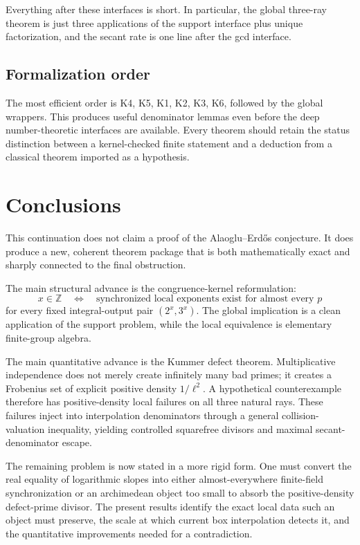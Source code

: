 \documentclass[11pt]{article}
\theoremstyle{definition}
\newcommand{\Z}{\mathbb Z}
\newcommand{\AEname}{Alaoglu--Erd\H{o}s}
\begin{document}
Everything after these interfaces is short.  In particular, the global three-ray theorem is
just three applications of the support interface plus unique factorization, and the secant
rate is one line after the gcd interface.

\subsection{Formalization order}

The most efficient order is K4, K5, K1, K2, K3, K6, followed by the global wrappers.  This
produces useful denominator lemmas even before the deep number-theoretic interfaces are
available.  Every theorem should retain the status distinction between a kernel-checked
finite statement and a deduction from a classical theorem imported as a hypothesis.

\section{Conclusions}
\label{sec:conclusion}

This continuation does not claim a proof of the \AEname{} conjecture.  It does produce a new,
coherent theorem package that is both mathematically exact and sharply connected to the final
obstruction.

The main structural advance is the congruence-kernel reformulation:
\[
 x\in\Z
 \quad\Longleftrightarrow\quad
 \text{synchronized local exponents exist for almost every }p
\]
for every fixed integral-output pair $(2^x,3^x)$.  The global implication is a clean
application of the support problem, while the local equivalence is elementary finite-group
algebra.

The main quantitative advance is the Kummer defect theorem.  Multiplicative independence does
not merely create infinitely many bad primes; it creates a Frobenius set of explicit positive
density $1/\ell^2$.  A hypothetical counterexample therefore has positive-density local
failures on all three natural rays.  These failures inject into interpolation denominators
through a general collision-valuation inequality, yielding controlled squarefree divisors and
maximal secant-denominator escape.

The remaining problem is now stated in a more rigid form.  One must convert the real equality
of logarithmic slopes into either almost-everywhere finite-field synchronization or an
archimedean object too small to absorb the positive-density defect-prime divisor.  The present
results identify the exact local data such an object must preserve, the scale at which current
box interpolation detects it, and the quantitative improvements needed for a contradiction.
\end{document}
